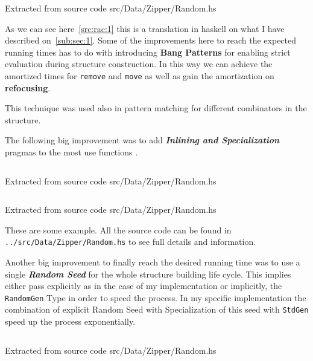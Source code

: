 \documentclass[12pt, a4paper]{article}
\begin{document}
\begin{listing}[H]
  \inputminted[firstline=9, lastline=37, breaklines]{haskell}{../src/Data/Zipper/Random.hs}
  \caption{Extracted from source code src/Data/Zipper/Random.hs}
  \label{src:rac:1}
\end{listing}

As we can see here~\ref{src:rac:1} this is a translation in \acrshort{haskell} on what I have described on~\ref{sub:sec:1}. Some of the improvements here to reach the expected running times has to do with introducing \textbf{Bang Patterns} \cite{bang} for enabling strict evaluation during structure construction. In this way we can achieve the amortized times for \texttt{remove} and \texttt{move} as well as gain the amortization on \textbf{refocusing}.

This technique was used also in pattern matching for different combinators in the structure.

The following big improvement was to add \textbf{\textit{Inlining and Specialization}} pragmas to the most use functions \cite{inline}.


\begin{listing}[H]
  \inputminted[firstline=59, lastline=63, breaklines]{haskell}{../src/Data/Zipper/Random.hs}
  \caption{Extracted from source code src/Data/Zipper/Random.hs}
  \label{src:rac:2}
\end{listing}


\begin{listing}[H]
  \inputminted[firstline=122, lastline=129, breaklines]{haskell}{../src/Data/Zipper/Random.hs}
  \caption{Extracted from source code src/Data/Zipper/Random.hs}
  \label{src:rac:3}
\end{listing}

These are some example. All the source code can be found in \texttt{../src/Data/Zipper/Random.hs} to see full details and information.

Another big improvement to finally reach the desired running time was to use a single \textbf{\textit{Random Seed}} for the whole structure building life cycle. This implies either pass explicitly as in the case of my implementation or implicitly, the \texttt{RandomGen} Type in order to speed the process. In my specific implementation the combination of explicit Random Seed with Specialization of this seed with \texttt{StdGen} speed up the process exponentially.


\begin{listing}[H]
  \inputminted[firstline=288, lastline=294, breaklines]{haskell}{../src/Data/Zipper/Random.hs}
  \caption{Extracted from source code src/Data/Zipper/Random.hs}
  \label{src:rac:4}
\end{listing}
\end{document}
